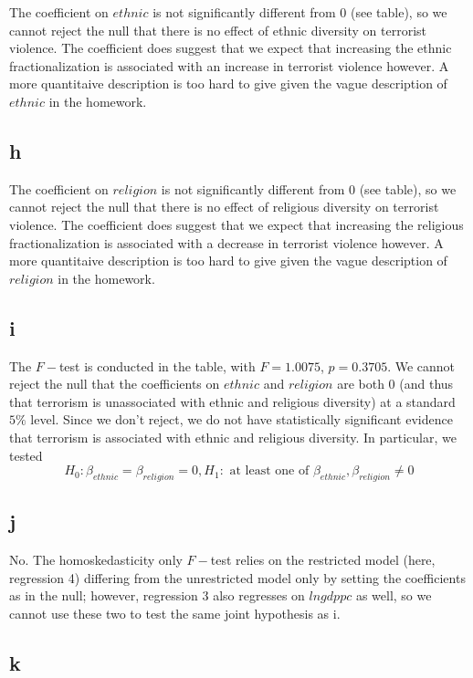 \documentclass[12pt,letterpaper]{article}
\theoremstyle{definition}
\begin{document}
The coefficient on $ethnic$ is not significantly different from 0 (see table), so we cannot reject the null that there is no effect of ethnic diversity on terrorist violence. The coefficient does suggest that we expect that increasing the ethnic fractionalization is associated with an increase in terrorist violence however. A more quantitaive description is too hard to give given the vague description of $ethnic$ in the homework.

\subsection*{h}

The coefficient on $religion$ is not significantly different from 0 (see table), so we cannot reject the null that there is no effect of religious diversity on terrorist violence. The coefficient does suggest that we expect that increasing the religious fractionalization is associated with a decrease in terrorist violence however. A more quantitaive description is too hard to give given the vague description of $religion$ in the homework.


\subsection*{i}

The $F-$test is conducted in the table, with $F=1.0075$, $p =0.3705$. We cannot reject the null that the coefficients on $ethnic$ and $religion$ are both $0$ (and thus that terrorism is unassociated with ethnic and religious diversity) at a standard $5\%$ level. Since we don't reject, we do not have statistically significant evidence that terrorism is associated with ethnic and religious diversity. In particular, we tested
\[
  H_{0}: \beta_{ethnic} = \beta_{religion} = 0, H_{1}: \text{ at least one of } \beta_{ethnic}, \beta_{religion} \neq 0
\]

\subsection*{j}

No. The homoskedasticity only $F-$test relies on the restricted model (here, regression 4) differing from the unrestricted model only by setting the coefficients as in the null; however, regression 3 also regresses on $lngdppc$ as well, so we cannot use these two to test the same joint hypothesis as i.

\subsection*{k}
\end{document}
